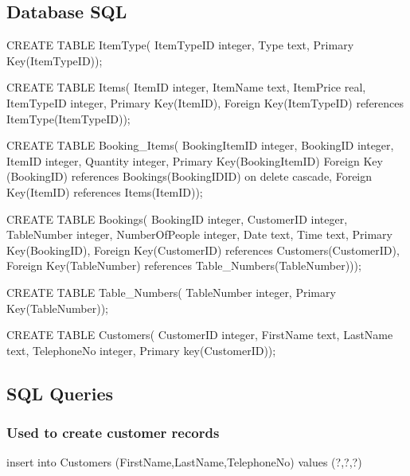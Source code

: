\newpage
\subsection{Database SQL}

\begin{sql}
CREATE TABLE ItemType(
    ItemTypeID integer,
    Type text,
    Primary Key(ItemTypeID));
\end{sql}

\begin{sql}
CREATE TABLE Items(
             ItemID integer,
             ItemName text,
             ItemPrice real,
             ItemTypeID integer,
             Primary Key(ItemID),
             Foreign Key(ItemTypeID) references ItemType(ItemTypeID));
\end{sql}

\begin{sql}
CREATE TABLE Booking_Items(
    BookingItemID integer,
    BookingID integer,
    ItemID  integer,
    Quantity integer,
    Primary Key(BookingItemID)
    Foreign Key (BookingID) references Bookings(BookingIDID) on delete cascade,
    Foreign Key(ItemID) references Items(ItemID));
\end{sql}

\begin{sql}
CREATE TABLE Bookings(
	BookingID integer,
             CustomerID integer,
             TableNumber integer,
             NumberOfPeople integer,
             Date text,
             Time text,
             Primary Key(BookingID),
             Foreign Key(CustomerID) references Customers(CustomerID),
             Foreign Key(TableNumber) references Table_Numbers(TableNumber)));
\end{sql}

\begin{sql}
CREATE TABLE Table_Numbers(
    TableNumber integer,
    Primary Key(TableNumber));
\end{sql}

\begin{sql}
CREATE TABLE Customers(
             CustomerID integer,
             FirstName text,
             LastName text,
             TelephoneNo integer,
             Primary key(CustomerID));
\end{sql}

\subsection{SQL Queries}

\subsubsection{Used to create customer records}
\begin{sql}
insert into Customers (FirstName,LastName,TelephoneNo) values (?,?,?)
\end{sql}


